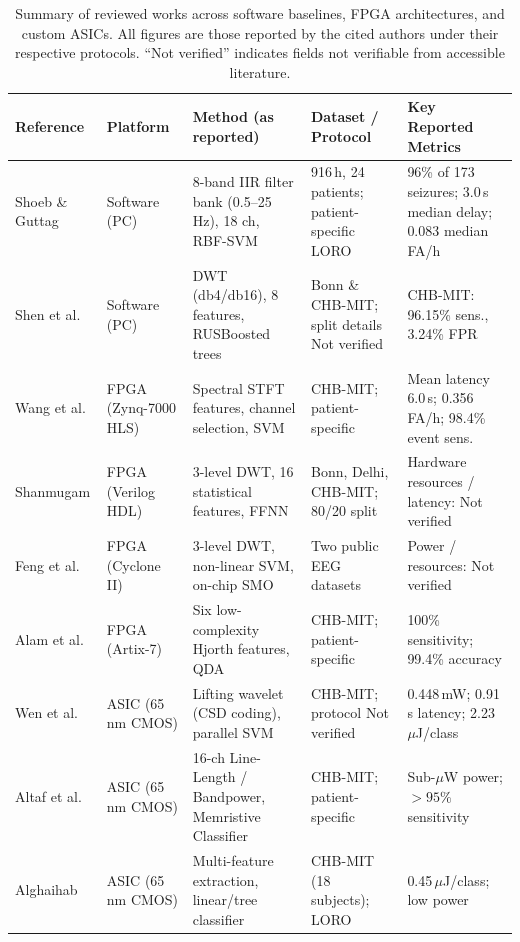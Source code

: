\documentclass[10pt,twocolumn,letterpaper]{article}
\begin{document}
\begin{table}[t]
\centering
\caption{Summary of reviewed works across software baselines, FPGA architectures, and custom ASICs. All figures are those reported by the cited authors under their respective protocols. ``Not verified'' indicates fields not verifiable from accessible literature.}
\label{tab:lit}
\footnotesize
\begin{tabularx}{\textwidth}{@{}p{2.1cm}p{2.3cm}XXX@{}}
\toprule
Reference & Platform & Method (as reported) & Dataset / Protocol & Key Reported Metrics \\
\midrule
Shoeb \& Guttag \cite{shoeb2010icml} & Software (PC) & 8-band IIR filter bank (0.5--25\,Hz), 18 ch, RBF-SVM & 916\,h, 24 patients; patient-specific LORO & 96\% of 173 seizures; 3.0\,s median delay; 0.083 median FA/h \\
Shen et al.\ \cite{shen2022dwt} & Software (PC) & DWT (db4/db16), 8 features, RUSBoosted trees & Bonn \& CHB-MIT; split details Not verified & CHB-MIT: 96.15\% sens., 3.24\% FPR \\
Wang et al.\ \cite{wang2017integrating} & FPGA (Zynq-7000 HLS) & Spectral STFT features, channel selection, SVM & CHB-MIT; patient-specific & Mean latency 6.0\,s; 0.356 FA/h; 98.4\% event sens. \\
Shanmugam \cite{shanmugam2025ffnn} & FPGA (Verilog HDL) & 3-level DWT, 16 statistical features, FFNN & Bonn, Delhi, CHB-MIT; 80/20 split & Hardware resources / latency: Not verified \\
Feng et al.\ \cite{feng2018vlsi} & FPGA (Cyclone II) & 3-level DWT, non-linear SVM, on-chip SMO & Two public EEG datasets & Power / resources: Not verified \\
Alam et al.\ \cite{alam2024qda} & FPGA (Artix-7) & Six low-complexity Hjorth features, QDA & CHB-MIT; patient-specific & 100\% sensitivity; 99.4\% accuracy \\
Wen et al.\ \cite{wen2022asic} & ASIC (65\,nm CMOS) & Lifting wavelet (CSD coding), parallel SVM & CHB-MIT; protocol Not verified & 0.448\,mW; 0.91\,s latency; 2.23\,$\mu$J/class \\
Altaf et al.\ \cite{altaf2015biomedical} & ASIC (65\,nm CMOS) & 16-ch Line-Length / Bandpower, Memristive Classifier & CHB-MIT; patient-specific & Sub-$\mu$W power; $>95\%$ sensitivity \\
Alghaihab \cite{alghaihab2022energy} & ASIC (65\,nm CMOS) & Multi-feature extraction, linear/tree classifier & CHB-MIT (18 subjects); LORO & 0.45\,$\mu$J/class; low power \\
\bottomrule
\end{tabularx}
\end{table}
\end{document}
